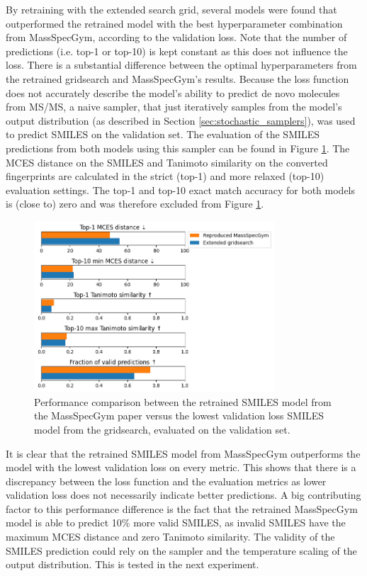 By retraining with the extended search grid, several models were found that outperformed the retrained model with the best hyperparameter combination from MassSpecGym, according to the validation loss.
Note that the number of predictions (i.e. top-1 or top-10) is kept constant as this does not influence the loss.
There is a substantial difference between the optimal hyperparameters from the retrained gridsearch and MassSpecGym's results.
Because the loss function does not accurately describe the model's ability to predict de novo molecules from \ac{MS/MS},
a naive sampler, that just iteratively samples from the model's output distribution (as described in Section \ref{sec:stochastic_samplers}), was used to predict SMILES on the validation set.
The evaluation of the SMILES predictions from both models using this sampler can be found in Figure \ref{fig:gridsearch_vs_paper}.
The \ac{MCES} distance on the SMILES and Tanimoto similarity on the converted fingerprints are calculated in the strict (top-1) and more relaxed (top-10) evaluation settings.
The top-1 and top-10 exact match accuracy for both models is (close to) zero and was therefore excluded from Figure \ref{fig:gridsearch_vs_paper}.

\begin{figure}[h]
    \centering
    \includegraphics[width=0.8\textwidth]{figures/results/gridsearch_vs_paper.png}
    \caption{Performance comparison between the retrained SMILES model from the MassSpecGym paper versus the lowest validation loss SMILES model from the gridsearch, evaluated on the validation set.}
    \label{fig:gridsearch_vs_paper}
\end{figure}

It is clear that the retrained SMILES model from MassSpecGym outperforms the model with the lowest validation loss on every metric.
This shows that there is a discrepancy between the loss function and the evaluation metrics as lower validation loss does not necessarily indicate better predictions.
A big contributing factor to this performance difference is the fact that the retrained MassSpecGym model is able to predict 10\% more valid SMILES, as invalid SMILES have the maximum MCES distance and zero Tanimoto similarity.
The validity of the SMILES prediction could rely on the sampler and the temperature scaling of the output distribution. This is tested in the next experiment.


